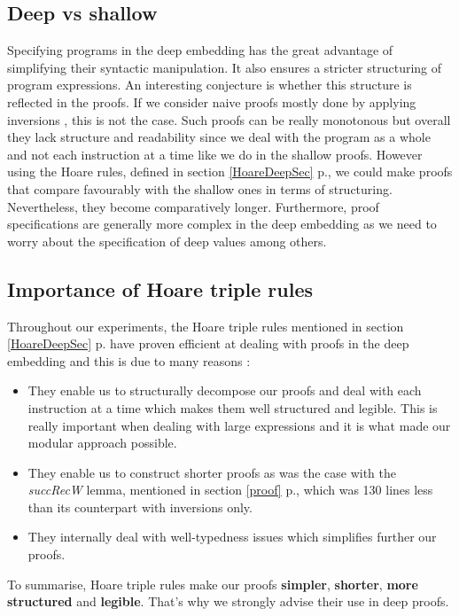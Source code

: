 \subsection{Deep vs shallow}
Specifying programs in the deep embedding has the great advantage of simplifying their syntactic manipulation. It also ensures a stricter structuring of program expressions. An interesting conjecture is whether this structure is reflected in the proofs. If we consider naive proofs mostly done by applying inversions , this is not the case. Such proofs can be really monotonous but overall they lack structure and readability since we deal with the program as a whole and not each instruction at a time like we do in the shallow proofs. However using the Hoare rules, defined in section \ref{HoareDeepSec} p.\pageref{HoareDeepSec}, we could make proofs that compare favourably with the shallow ones in terms of structuring. Nevertheless, they become comparatively longer. Furthermore, proof specifications are generally more complex in the deep embedding as we need to worry about the specification of deep values among others. 

\subsection{Importance of Hoare triple rules} \label{HoareRules}
Throughout our experiments, the Hoare triple rules mentioned in section \ref{HoareDeepSec} p.\pageref{HoareDeepSec} have proven efficient at dealing with proofs in the deep embedding and this is due to many reasons :
\begin{itemize}
	\item They enable us to structurally decompose our proofs and deal with each instruction at a time which makes them well structured and legible. This is really important when dealing with large expressions and it is what made our modular approach possible.
	\item They enable us to construct shorter proofs as was the case with the \textit{succRecW} lemma, mentioned in section \ref{proof} p.\pageref{proof}, which was 130 lines less than its counterpart with inversions only. 
	\item They internally deal with well-typedness issues which simplifies further our proofs.
\end{itemize}

To summarise, Hoare triple rules make our proofs \textbf{simpler}, \textbf{shorter}, \textbf{more structured} and \textbf{legible}. That's why we strongly advise their use in deep proofs. \pagebreak

